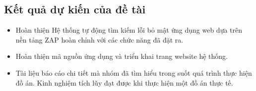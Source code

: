 \subsection{Kết quả dự kiến của đề tài}
\begin{itemize}
    \item Hoàn thiện Hệ thống tự động tìm kiếm lỗi bỏ mật ứng dụng web dựa trên nền tảng ZAP hoàn chỉnh với các chức năng đã đặt ra.
    \item Hoàn thiện mã nguồn ứng dụng và triển khai trang website hệ thống.
    \item Tài liệu báo cáo chi tiết mà nhóm đã tìm hiểu trong suốt quá trình thực hiện đồ án. Kinh nghiệm tích lũy đạt được khi thực hiện một đồ án thực tế.
\end{itemize}